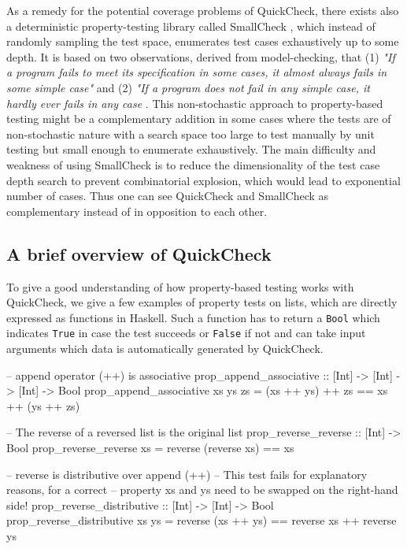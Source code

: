 \medskip

As a remedy for the potential coverage problems of QuickCheck, there exists also a deterministic property-testing library called SmallCheck \cite{runciman_smallcheck_2008}, which instead of randomly sampling the test space, enumerates test cases exhaustively up to some depth. It is based on two observations, derived from model-checking, that (1) \textit{"If a program fails to meet its specification in some cases, it almost always fails in some simple case"} and (2) \textit{"If a program does not fail in any simple case, it hardly ever fails in any case} \cite{runciman_smallcheck_2008}. This non-stochastic approach to property-based testing might be a complementary addition in some cases where the tests are of non-stochastic nature with a search space too large to test manually by unit testing but small enough to enumerate exhaustively. The main difficulty and weakness of using SmallCheck is to reduce the dimensionality of the test case depth search to prevent combinatorial explosion, which would lead to exponential number of cases. Thus one can see QuickCheck and SmallCheck as complementary instead of in opposition to each other.

\subsection{A brief overview of QuickCheck}
To give a good understanding of how property-based testing works with \\ QuickCheck, we give a few examples of property tests on lists, which are directly expressed as functions in Haskell. Such a function has to return a \texttt{Bool} which indicates \texttt{True} in case the test succeeds or \texttt{False} if not and can take input arguments which data is automatically generated by QuickCheck.

\begin{HaskellCode}
-- append operator (++) is associative
prop_append_associative :: [Int] -> [Int] -> [Int] -> Bool
prop_append_associative xs ys zs = (xs ++ ys) ++ zs == xs ++ (ys ++ zs)

-- The reverse of a reversed list is the original list
prop_reverse_reverse :: [Int] -> Bool
prop_reverse_reverse xs = reverse (reverse xs) == xs

-- reverse is distributive over append (++)
-- This test fails for explanatory reasons, for a correct 
-- property xs and ys need to be swapped on the right-hand side!
prop_reverse_distributive :: [Int] -> [Int] -> Bool
prop_reverse_distributive xs ys = reverse (xs ++ ys) == reverse xs ++ reverse ys
\end{HaskellCode}

